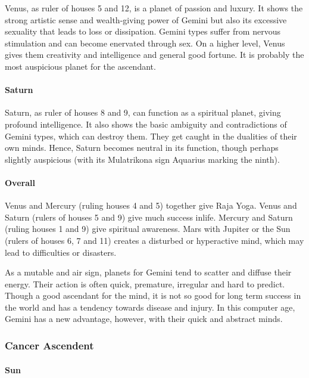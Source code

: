 Venus, as ruler of houses 5 and 12, is a planet of passion and luxury. It shows the strong artistic sense and wealth-giving power of Gemini but also its excessive sexuality that leads to loss or dissipation. Gemini types suffer from nervous stimulation and can become enervated through sex. On a higher level, Venus gives them creativity and intelligence and general good fortune. It is probably the most auspicious planet for the ascendant.

 

\paragraph{Saturn}

Saturn, as ruler of houses 8 and 9, can function as a spiritual planet, giving profound intelligence. It also shows the basic ambiguity and contradictions of Gemini types, which can destroy them. They get caught in the dualities of their own minds. Hence, Saturn becomes neutral in its function, though perhaps slightly auspicious (with its Mulatrikona sign Aquarius marking the ninth).

 

\paragraph{Overall}

Venus and Mercury (ruling houses 4 and 5) together give Raja Yoga. Venus and Saturn (rulers of houses 5 and 9) give much success inlife.  Mercury and Saturn (ruling houses 1 and 9) give spiritual awareness. Mars with Jupiter or the Sun (rulers of houses 6, 7 and 11) creates a disturbed or hyperactive mind, which may lead to difficulties or disasters.

 

As a mutable and air sign, planets for Gemini tend to scatter and diffuse their energy. Their action is often quick, premature, irregular and hard to predict. Though a good ascendant for the mind, it is not so good for long term success in the world and has a tendency towards disease and injury. In this computer age, Gemini has a new advantage, however, with their quick and abstract minds.

 

\subsubsection{Cancer Ascendent}
 

\paragraph{Sun}


